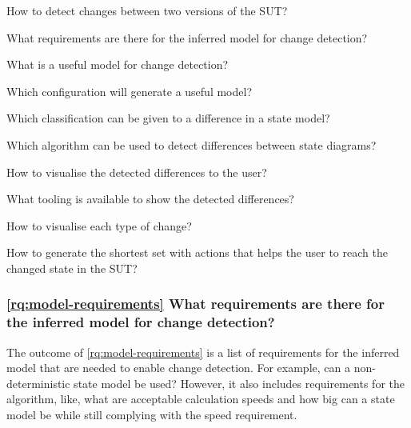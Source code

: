 \begin{questions}
    \item How to detect changes between two versions of the SUT? \label{rq:detect-changes}
    \begin{questions}
        \item What requirements are there for the inferred model for change detection? \label{rq:model-requirements}
        \item What is a useful model for change detection? \label{rq:useful-model}
        \item Which configuration will generate a useful model? \label{rq:gen-useful-model}
        \item Which classification can be given to a difference in a state model? \label{rq:classifications} 
        \item Which algorithm can be used to detect differences between state diagrams? \label{rq:difference-algorithm}
    \end{questions}

    \item How to visualise the detected differences to the user? \label{rq:diff-visualisation}
    \begin{questions}
        \item What tooling is available to show the detected differences? \label{rq:tooling}
        \item How to visualise each type of change? \label{rq:type-visualisation}
        \item How to generate the shortest set with actions that helps the user to reach the changed state in the SUT? \label{rq:shortest-set}    
    \end{questions}

\end{questions}

\subsubsection{\ref{rq:model-requirements} What requirements are there for the inferred model for change detection?}
The outcome of \ref{rq:model-requirements} is a list of requirements for the inferred model that are needed to enable change detection. For example, can a non-deterministic state model be used? However, it also includes requirements for the algorithm, like, what are acceptable calculation speeds and how big can a state model be while still complying with the speed requirement. 

